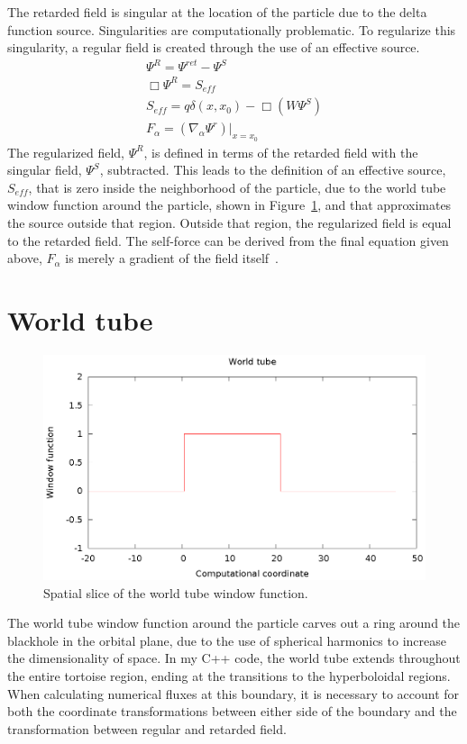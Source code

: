 The retarded field is singular at the location of the particle due to the delta function source. Singularities are computationally problematic. To regularize this singularity, a regular field is created through the use of an effective source.
\begin{eqnarray}
\Psi^R=\Psi^{ret}-\Psi^S\\
\Box\Psi^R=S_{eff}\\
S_{eff}=q\delta(x,x_0)-\Box(W\Psi^S)\\
F_\alpha=(\nabla_\alpha\Psi^r)|_{x=x_0}
\end{eqnarray}
The regularized field, $\Psi^R$, is defined in terms of the retarded field with the singular field, $\Psi^S$, subtracted. This leads to the definition of an effective source, $S_{eff}$, that is zero inside the neighborhood of the particle, due to the world tube window function around the particle, shown in Figure~\ref{wtwindow}, and that approximates the source outside that region. Outside that region, the regularized field is equal to the retarded field. The self-force can be derived from the final equation given above, $F_\alpha$ is merely a gradient of the field itself~\cite{vega_wardell_diener_eff_source}. 


\section{World tube}
\begin{figure}
\includegraphics{worldTubeItself}
\caption{Spatial slice of the world tube window function.}
\label{wtwindow}
\end{figure}

The world tube window function around the particle carves out a ring around the blackhole in the orbital plane, due to the use of spherical harmonics to increase the dimensionality of space. In my C++ code, the world tube extends throughout the entire tortoise region, ending at the transitions to the hyperboloidal regions. When calculating numerical fluxes at this boundary, it is necessary to account for both the coordinate transformations between either side of the boundary and the transformation between regular and retarded field.

